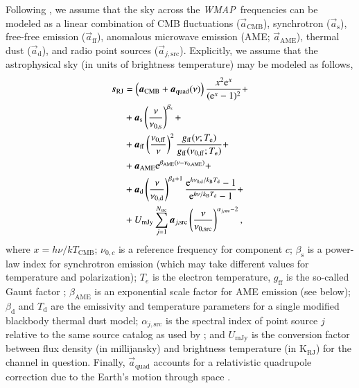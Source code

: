 \documentclass[twocolumn]{../../common/aa}
\def\WMAP{\emph{WMAP}}
\renewcommand{\a}[0]{\vec{a}}
\newcommand{\Te}[0]{T_{\rm e}}
\newcommand{\e}{\mathrm e}
\def\Tdust{\ifmmode T_\mathrm{d}\else $T_{\mathrm{d}}$\fi}
\def\bdust{\ifmmode \beta_\mathrm{d}\else $\beta_{\mathrm{d}}$\fi}
\def\bsynch{\ifmmode \beta_\mathrm{s}\else $\beta_{\mathrm{s}}$\fi}
\def\nuzeros{\ifmmode \nu_{0,\mathrm{s}}\else $\nu_{0,\mathrm{s}}$\fi}
\def\nuzeroff{\ifmmode \nu_{0,\mathrm{ff}}\else $\nu_{0,\mathrm{ff}}$\fi}
\def\nuzerod{\ifmmode \nu_{0,\mathrm{d}}\else $\nu_{0,\mathrm{d}}$\fi}
\def\nuzeroame{\ifmmode \nu_{0,\mathrm{AME}}\else $\nu_{0,\mathrm{AME}}$\fi}
\def\nuzerosrc{\ifmmode \nu_{0,\mathrm{src}}\else $\nu_{0,\mathrm{src}}$\fi}
\def\nup{\ifmmode \nu_{\mathrm{p}}\else $\nu_{\mathrm{p}}$\fi}
\def\Te{\ifmmode T_{\mathrm{e}}\else $T_{\mathrm{e}}$\fi}
\def\kB{\ifmmode k_\mathrm{B}\else $k_{\mathrm{B}}$\fi}
\begin{document}
Following \citet{bp01}, we assume that the sky across the \WMAP\ frequencies can be modeled as a linear combination of CMB fluctuations ($\vec{a}_{\mathrm{CMB}}$), synchrotron ($\vec{a}_{\mathrm{s}}$), free-free emission ($\vec{a}_{\mathrm{ff}}$), anomalous microwave emission (AME; $\vec{a}_{\mathrm{AME}}$), thermal dust ($\vec{a}_{\mathrm{d}}$), and radio point sources ($\vec{a}_{j,\mathrm{src}}$). Explicitly, we assume that the astrophysical sky (in units of brightness temperature) may be modeled as follows,
\begin{align}
  \vec{s}_{\mathrm{RJ}} &= \left(\vec{a}_{\mathrm{CMB}}+\vec{a}_{\mathrm{quad}}(\nu)\right) \frac{x^2 \e^x}{(\e^x -1)^2}+\label{eq:cmb_astsky}\\
  &+ \vec{a}_{\mathrm{s}} \left(\frac{\nu}{\nuzeros}\right)^{\bsynch} + \label{eq:synch_astsky}\\
  &+ \vec{a}_{\mathrm{ff}} \left(\frac{\nuzeroff}{\nu}\right)^2 \frac{g_{\mathrm{ff}}(\nu;\Te) }{g_{\mathrm{ff}}(\nuzeroff;\Te)} +\label{eq:ff_astsky}\\
  &+ \vec{a}_{\mathrm{AME}} \e^{\beta_{\mathrm{AME}}(\nu-\nu_{0,\mathrm{AME}})}+\label{eq:ame_astsky}  \\
  &+ \vec{a}_{\mathrm{d}} \left(\frac{\nu}{\nuzerod}\right)^{\bdust+1} \frac{\e^{h\nuzerod/\kB\Tdust}-1}{\e^{h\nu/\kB\Tdust}-1}+ \label{eq:dust_astsky}\\
  &+ U_{\mathrm{mJy}} \sum_{j=1}^{N_{\mathrm{src}}} \vec{a}_{j,\mathrm{src}} \left(\frac{\nu}{\nuzerosrc}\right)^{\alpha_{j,\mathrm{src}}-2}, \label{eq:sum_ptsrc}
\end{align}
where $x=h\nu/kT_{\mathrm{CMB}}$; $\nu_{0,c}$ is a reference frequency for component $c$; $\beta_{\mathrm{s}}$ is a power-law index for synchrotron emission (which may take different values for temperature and polarization); $T_e$ is the electron temperature, $g_{\mathrm{ff}}$ is the so-called Gaunt factor \citep{dickinson2003}; $\beta_{\mathrm{AME}}$ is an exponential scale factor for AME emission (see below); $\beta_{\mathrm{d}}$ and $T_{\mathrm{d}}$ are the emissivity and temperature parameters for a single modified blackbody thermal dust model; $\alpha_{j,\mathrm{src}}$ is the spectral index of point source $j$ relative to the same source catalog as used by \citet{planck2016-l04}; and $U_{\mathrm{mJy}}$ is the conversion factor between flux density (in millijansky) and brightness temperature (in $\mathrm{K_{RJ}}$) for the channel in question. Finally, $\a_{\mathrm{quad}}$ accounts for a relativistic quadrupole correction due to the Earth's motion through space \citep{Notari:2015}.
\end{document}
